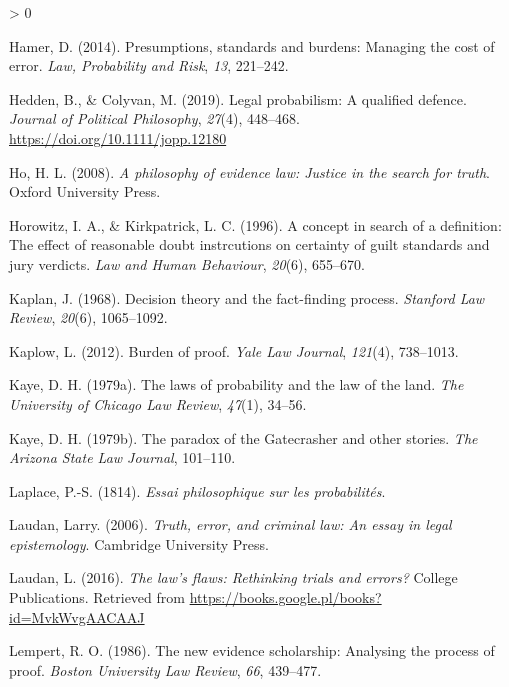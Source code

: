 \documentclass[
  10pt,
  dvipsnames,enabledeprecatedfontcommands]{scrartcl}
\newlength{\cslhangindent}
\newenvironment{CSLReferences}[2] %
 {%
  \setlength{\parindent}{0pt}
  \ifodd #1 \everypar{\setlength{\hangindent}{\cslhangindent}}\ignorespaces\fi
  \ifnum #2 > 0
  \setlength{\parskip}{#2\baselineskip}
  \fi
 }%
 {}
\begin{document}
\begin{CSLReferences}{1}{0}
\leavevmode\hypertarget{ref-hamer2014}{}%
Hamer, D. (2014). Presumptions, standards and burdens: Managing the cost
of error. \emph{Law, Probability and Risk}, \emph{13}, 221--242.

\leavevmode\hypertarget{ref-HeddenColyvan2019legal}{}%
Hedden, B., \& Colyvan, M. (2019). Legal probabilism: A qualified
defence. \emph{Journal of Political Philosophy}, \emph{27}(4), 448--468.
\url{https://doi.org/10.1111/jopp.12180}

\leavevmode\hypertarget{ref-ho2008philosophy}{}%
Ho, H. L. (2008). \emph{A philosophy of evidence law: Justice in the
search for truth}. Oxford University Press.

\leavevmode\hypertarget{ref-Horowitz1996}{}%
Horowitz, I. A., \& Kirkpatrick, L. C. (1996). A concept in search of a
definition: The effect of reasonable doubt instrcutions on certainty of
guilt standards and jury verdicts. \emph{Law and Human Behaviour},
\emph{20}(6), 655--670.

\leavevmode\hypertarget{ref-Kaplan1968decision}{}%
Kaplan, J. (1968). Decision theory and the fact-finding process.
\emph{Stanford Law Review}, \emph{20}(6), 1065--1092.

\leavevmode\hypertarget{ref-kaplow2012}{}%
Kaplow, L. (2012). Burden of proof. \emph{Yale Law Journal},
\emph{121}(4), 738--1013.

\leavevmode\hypertarget{ref-kaye79}{}%
Kaye, D. H. (1979a). The laws of probability and the law of the land.
\emph{The University of Chicago Law Review}, \emph{47}(1), 34--56.

\leavevmode\hypertarget{ref-Kaye79gate}{}%
Kaye, D. H. (1979b). The paradox of the {G}atecrasher and other stories.
\emph{The Arizona State Law Journal}, 101--110.

\leavevmode\hypertarget{ref-Laplace1814}{}%
Laplace, P.-S. (1814). \emph{Essai philosophique sur les probabilités}.

\leavevmode\hypertarget{ref-laudan2006truth}{}%
Laudan, Larry. (2006). \emph{Truth, error, and criminal law: An essay in
legal epistemology}. Cambridge University Press.

\leavevmode\hypertarget{ref-laudan2016law}{}%
Laudan, L. (2016). \emph{The law's flaws: Rethinking trials and errors?}
College Publications. Retrieved from
\url{https://books.google.pl/books?id=MvkWvgAACAAJ}

\leavevmode\hypertarget{ref-Lempert1986}{}%
Lempert, R. O. (1986). The new evidence scholarship: Analysing the
process of proof. \emph{Boston University Law Review}, \emph{66},
439--477.


\end{CSLReferences}
\end{document}
